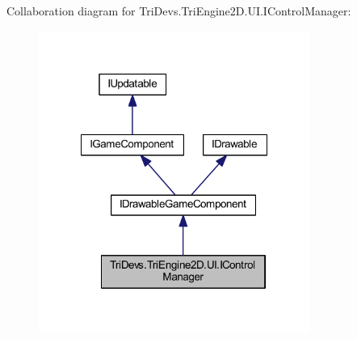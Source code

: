 Collaboration diagram for Tri\-Devs.\-Tri\-Engine2\-D.\-U\-I.\-I\-Control\-Manager\-:
\nopagebreak
\begin{figure}[H]
\begin{center}
\leavevmode
\includegraphics[width=251pt]{interface_tri_devs_1_1_tri_engine2_d_1_1_u_i_1_1_i_control_manager__coll__graph}
\end{center}
\end{figure}
